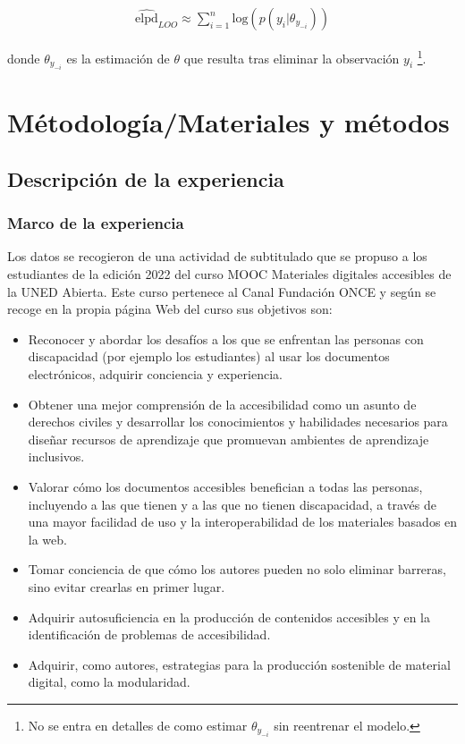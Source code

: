 \documentclass[
  12pt,
  a4paper,
  extrafontsizes,
  onecolumn,
  openright]{memoir}
\begin{document}
\[
\begin{aligned}
\widehat{\mathrm{elpd}}_{LOO} \approx \sum_{i=1}^{n} \mathrm{log} (p(y_{i} | \theta_{y_{-i}}))
\end{aligned}
\]

donde \(\theta_{y_{-i}}\) es la estimación de \(\theta\) que resulta
tras eliminar la observación \(y_{i}\) \footnote{No se entra en detalles
  de como estimar \(\theta_{y_{-i}}\) sin reentrenar el modelo.}.


\hypertarget{sec-metodo}{%
\chapter{Métodología/Materiales y métodos}\label{sec-metodo}}

\hypertarget{descripciuxf3n-de-la-experiencia}{%
\section{Descripción de la
experiencia}\label{descripciuxf3n-de-la-experiencia}}

\hypertarget{marco-de-la-experiencia}{%
\subsection{Marco de la experiencia}\label{marco-de-la-experiencia}}

Los datos se recogieron de una actividad de subtitulado que se propuso a
los estudiantes de la edición 2022 del curso MOOC Materiales digitales
accesibles de la UNED Abierta. Este curso pertenece al Canal Fundación
ONCE y según se recoge en la propia página Web del curso sus objetivos
son:

\begin{itemize}
\item
  Reconocer y abordar los desafíos a los que se enfrentan las personas
  con discapacidad (por ejemplo los estudiantes) al usar los documentos
  electrónicos, adquirir conciencia y experiencia.
\item
  Obtener una mejor comprensión de la accesibilidad como un asunto de
  derechos civiles y desarrollar los conocimientos y habilidades
  necesarios para diseñar recursos de aprendizaje que promuevan
  ambientes de aprendizaje inclusivos.
\item
  Valorar cómo los documentos accesibles benefician a todas las
  personas, incluyendo a las que tienen y a las que no tienen
  discapacidad, a través de una mayor facilidad de uso y la
  interoperabilidad de los materiales basados en la web.
\item
  Tomar conciencia de que cómo los autores pueden no solo eliminar
  barreras, sino evitar crearlas en primer lugar.
\item
  Adquirir autosuficiencia en la producción de contenidos accesibles y
  en la identificación de problemas de accesibilidad.
\item
  Adquirir, como autores, estrategias para la producción sostenible de
  material digital, como la modularidad.
\end{itemize}
\end{document}
